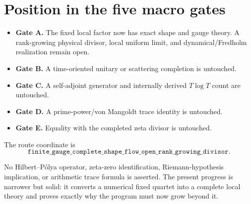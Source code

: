 \documentclass[12pt]{article}
\theoremstyle{remark}\newtheorem{remark}[theorem]{Remark}
\begin{document}
\section{Position in the five macro gates}

\begin{itemize}[leftmargin=2em]
\item \textbf{Gate A.}  The fixed local factor now has exact shape and gauge
theory.  A rank-growing physical divisor, local uniform limit, and
dynamical/Fredholm realization remain open.
\item \textbf{Gate B.}  A time-oriented unitary or scattering completion is
untouched.
\item \textbf{Gate C.}  A self-adjoint generator and internally derived
$T\log T$ count are untouched.
\item \textbf{Gate D.}  A prime-power/von Mangoldt trace identity is
untouched.
\item \textbf{Gate E.}  Equality with the completed zeta divisor is
untouched.
\end{itemize}

The route coordinate is
\begin{equation*}
 \boxed{\texttt{finite\_gauge\_complete\_shape\_flow\_open\_rank\_growing\_divisor}}.
\end{equation*}

No Hilbert--P\'olya operator, zeta-zero identification, Riemann-hypothesis
implication, or arithmetic trace formula is asserted.  The present progress
is narrower but solid: it converts a numerical fixed quartet into a complete
local theory and proves exactly why the program must now grow beyond it.


\end{document}
